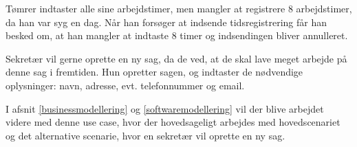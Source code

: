 Tømrer indtaster alle sine arbejdstimer, men mangler at registrere 8 arbejdstimer, da han var syg en dag.
Når han forsøger at indsende tidsregistrering får han besked om, at han mangler at indtaste 8 timer og indsendingen bliver annulleret.

Sekretær vil gerne oprette en ny sag, da de ved, at de skal lave meget arbejde på denne sag i fremtiden.
Hun opretter sagen, og indtaster de nødvendige oplysninger: navn, adresse, evt. telefonnummer og email.

I afsnit \ref{businessmodellering} og \ref{softwaremodellering} vil der blive arbejdet videre med denne use case, hvor der hovedsageligt arbejdes med hovedscenariet og det alternative scenarie, hvor en sekretær vil oprette en ny sag.


